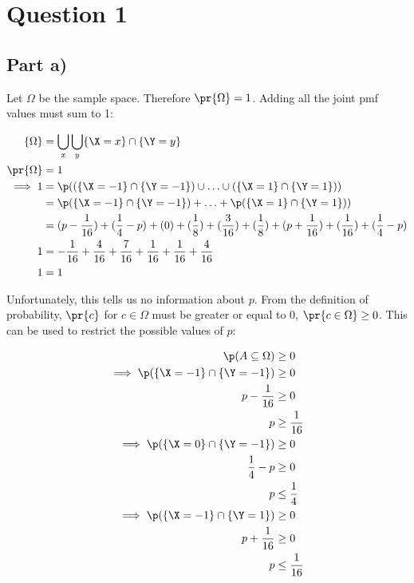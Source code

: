 \section{Question 1}

\subsection{Part a)}

Let $\Omega$ be the sample space. Therefore $\pr{\Omega} = 1$.
Adding all the joint pmf values must sum to 1:

\begin{align*}
\{ \Omega \} &= \bigcup \limits _{x} \bigcup \limits _y \{ \X = x \} \cap \{ \Y = y \} \\
\pr{\Omega} &= 1 \\
\implies 1 &= \p((\{ \X = -1 \} \cap \{ \Y = -1 \}) \cup \ldots \cup (\{ \X = 1 \} \cap \{ \Y = 1 \})) \\
&= \p(\{ \X = -1 \} \cap \{ \Y = -1 \}) + \ldots + \p(\{ \X = 1 \} \cap \{ \Y = 1 \})) \\
&= (p - \frac{1}{16}) + (\frac{1}{4} - p) + (0) +
(\frac{1}{8}) + (\frac{3}{16}) + (\frac{1}{8}) +
(p + \frac{1}{16}) + (\frac{1}{16}) + (\frac{1}{4} - p) \\
1 &= -\frac{1}{16} + \frac{4}{16} + \frac{7}{16} + \frac{1}{16} + \frac{1}{16} + \frac{4}{16} \\
1 &= 1
\end{align*}

Unfortunately, this tells us no information about $p$.
From the definition of probability, $\pr{c}$ for $c \in \Omega$ must be greater or equal to 0, $\pr{c \in \Omega} \geq 0$.
This can be used to restrict the possible values of $p$:

\begin{align*}
\p(A \subseteq \Omega) &\geq 0 \\
\implies \p(\{ \X = -1 \} \cap \{ \Y = -1 \}) &\geq 0 \\
p - \frac{1}{16} &\geq 0 \\
p &\geq \frac{1}{16} \\
\implies \p(\{ \X = 0 \} \cap \{ \Y = -1 \}) &\geq 0 \\
\frac{1}{4} - p &\geq 0 \\
p &\leq \frac{1}{4} \\
\implies \p(\{ \X = -1 \} \cap \{ \Y = 1 \}) &\geq 0 \\
p + \frac{1}{16} &\geq 0 \\
p &\leq \frac{1}{16}
\end{align*}

